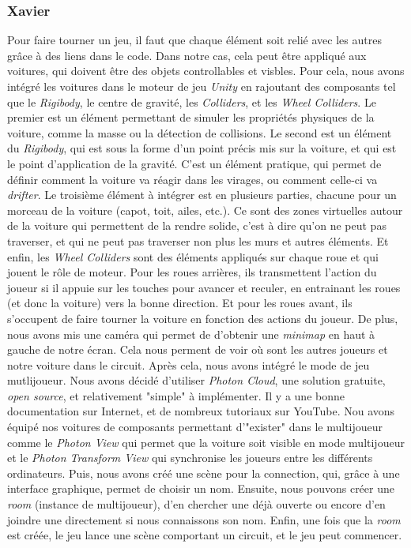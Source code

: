 \documentclass[12pt,a4paper]{article}
\begin{document}
    \subsubsection{Xavier}
        Pour faire tourner un jeu, il faut que chaque élément soit relié avec
        les autres grâce à des liens dans le code. Dans notre cas, cela peut être
        appliqué aux voitures, qui doivent être des objets controllables et visbles.
        Pour cela, nous avons intégré les voitures dans le moteur de jeu \textsl{Unity}
        en rajoutant des composants tel que le \textit{Rigibody}, le centre de gravité,
        les \textit{Colliders}, et les \textit{Wheel Colliders}. Le premier est un élément
        permettant de simuler les propriétés physiques de la voiture, comme la masse ou la
        détection de collisions. Le second est un élément du \textit{Rigibody}, qui est sous
        la forme d'un point précis mis sur la voiture, et qui est le point d'application
        de la gravité. C'est un élément pratique, qui permet de définir comment la
        voiture va réagir dans les virages, ou comment celle-ci va \textit{drifter}.
        Le troisième élément à intégrer est en plusieurs parties, chacune pour un morceau
        de la voiture (capot, toit, ailes, etc.). Ce sont des zones virtuelles autour
        de la voiture qui permettent de la rendre solide, c'est à dire qu'on ne peut pas
        traverser, et qui ne peut pas traverser non plus les murs et autres éléments.
        Et enfin, les \textit{Wheel Colliders} sont des éléments appliqués sur chaque roue
        et qui jouent le rôle de moteur. Pour les roues arrières, ils transmettent l'action
        du joueur si il appuie sur les touches pour avancer et reculer, en entrainant les
        roues (et donc la voiture) vers la bonne direction. Et pour les roues avant,
        ils s'occupent de faire tourner la voiture en fonction des actions du joueur.
        De plus, nous avons mis une caméra qui permet de d'obtenir une \textit{minimap}
        en haut à gauche de notre écran. Cela nous perment de voir où sont les autres
        joueurs et notre voiture dans le circuit.
        Après cela, nous avons intégré le mode de jeu mutlijoueur. Nous avons décidé
        d'utiliser \textsl{Photon Cloud}, une solution gratuite, \textit{open source},
        et relativement "simple" à implémenter. Il y a une bonne documentation sur
        Internet, et de nombreux tutoriaux sur YouTube. Nou avons équipé nos voitures
        de composants permettant d'"exister" dans le multijoueur comme le \textit{Photon View}
        qui permet que la voiture soit visible en mode multijoueur et le \textit{Photon
        Transform View} qui synchronise les joueurs entre les différents ordinateurs.
        Puis, nous avons 
        créé une scène pour la connection, qui, grâce à une interface graphique,
        permet de choisir un nom. Ensuite, nous pouvons créer une \textit{room}
        (instance de multijoueur), d'en chercher une déjà ouverte ou encore
        d'en joindre une directement si nous connaissons son nom. Enfin, une
        fois que la \textit{room} est créée, le jeu lance une scène comportant
        un circuit, et le jeu peut commencer.
\clearpage
\end{document}
